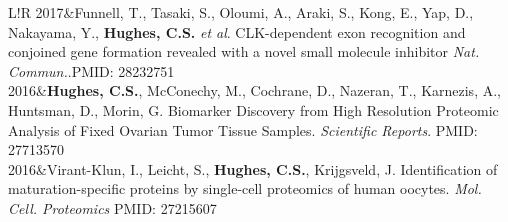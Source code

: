 \documentclass[11pt]{article}
\newcommand\VRule{\color{lightgray}\vrule width 0.5pt}
\begin{document}
{\begin{tabular}{L!{\VRule}R}
	2017&Funnell, T., Tasaki, S., Oloumi, A., Araki, S., Kong, E., Yap, D., Nakayama, Y., \textbf{Hughes, C.S.} \textit{et al}. CLK-dependent exon
	recognition and conjoined gene formation revealed with a novel small molecule inhibitor \textit{Nat. Commun.}.PMID: 28232751\\
	2016&\textbf{Hughes, C.S.}, McConechy, M., Cochrane, D., Nazeran, T., Karnezis, A., Huntsman, D., Morin, G. Biomarker Discovery from High Resolution Proteomic Analysis of Fixed Ovarian Tumor Tissue Samples. \textit{Scientific Reports}. PMID: 27713570\\
	2016&Virant-Klun, I., Leicht, S., \textbf{Hughes, C.S.}, Krijgsveld, J. Identification of maturation-specific proteins by single-cell proteomics of human oocytes. \textit{Mol. Cell. Proteomics} PMID: 27215607\\

\end{tabular}

\newpage

}
\end{document}
